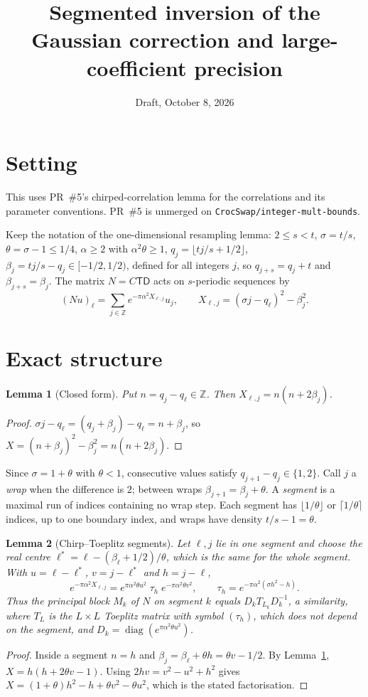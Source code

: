 \documentclass[11pt]{article}
\title{Segmented inversion of the Gaussian correction and large-coefficient precision}
\date{Draft, October 8, 2026}
\newtheorem{lemma}{Lemma}
\theoremstyle{remark}\newtheorem*{remark}{Remark}
\begin{document}
\maketitle

\section*{Setting}
This uses PR~\#5's chirped-correlation lemma for the correlations and its parameter conventions. PR~\#5 is unmerged on \texttt{CrocSwap/integer-mult-bounds}.

Keep the notation of the one-dimensional resampling lemma:
$2\le s<t$, $\sigma=t/s$, $\theta=\sigma-1\le1/4$, $\alpha\ge2$ with $\alpha^2\theta\ge1$,
$q_j=\lfloor tj/s+1/2\rfloor$, $\beta_j=tj/s-q_j\in[-1/2,1/2)$, defined for all
integers $j$, so $q_{j+s}=q_j+t$ and $\beta_{j+s}=\beta_j$. The matrix $N=C\mathsf T\mathsf D$
acts on $s$-periodic sequences by
\[
 (Nu)_\ell=\sum_{j\in\mathbb Z}e^{-\pi\alpha^2X_{\ell,j}}u_j,\qquad
 X_{\ell,j}=(\sigma j-q_\ell)^2-\beta_j^2 .
\]

\section{Exact structure}

\begin{lemma}[Closed form]\label{lem:closed}
Put $n=q_j-q_\ell\in\mathbb Z$. Then $X_{\ell,j}=n(n+2\beta_j)$.
\end{lemma}
\begin{proof}
$\sigma j-q_\ell=(q_j+\beta_j)-q_\ell=n+\beta_j$, so
$X=(n+\beta_j)^2-\beta_j^2=n(n+2\beta_j)$.
\end{proof}

Since $\sigma=1+\theta$ with $\theta<1$, consecutive values satisfy
$q_{j+1}-q_j\in\{1,2\}$. Call $j$ a \emph{wrap} when the difference is $2$;
between wraps $\beta_{j+1}=\beta_j+\theta$. A \emph{segment} is a maximal run of
indices containing no wrap step. Each segment has $\lfloor1/\theta\rfloor$ or
$\lceil1/\theta\rceil$ indices, up to one boundary index, and wraps have density
$t/s-1=\theta$.

\begin{lemma}[Chirp--Toeplitz segments]\label{lem:segment}
Let $\ell,j$ lie in one segment and choose the real centre
$\ell^*=\ell-(\beta_\ell+1/2)/\theta$, which is the same for the whole segment.
With $u=\ell-\ell^*$, $v=j-\ell^*$ and $h=j-\ell$,
\[
 e^{-\pi\alpha^2X_{\ell,j}}
  =e^{\pi\alpha^2\theta u^2}\;\tau_h\;e^{-\pi\alpha^2\theta v^2},
 \qquad \tau_h=e^{-\pi\alpha^2(\sigma h^2-h)} .
\]
Thus the principal block $M_k$ of $N$ on segment $k$ equals $D_kT_{L_k}D_k^{-1}$, a similarity,
where $T_L$ is the $L\times L$ Toeplitz matrix with symbol $(\tau_h)$, which does not
depend on the segment, and $D_k=\operatorname{diag}(e^{\pi\alpha^2\theta u^2})$.
\end{lemma}
\begin{proof}
Inside a segment $n=h$ and $\beta_j=\beta_\ell+\theta h=\theta v-1/2$. By
Lemma~\ref{lem:closed}, $X=h(h+2\theta v-1)$. Using $2hv=v^2-u^2+h^2$ gives
$X=(1+\theta)h^2-h+\theta v^2-\theta u^2$, which is the stated factorisation.
\end{proof}
\end{document}
